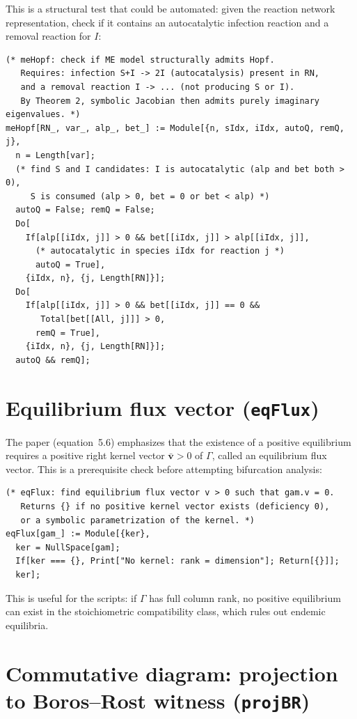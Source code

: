 \documentclass[11pt]{article}
\begin{document}
This is a structural test that could be automated: given the reaction network
representation, check if it contains an autocatalytic infection reaction and a
removal reaction for $I$:
\begin{verbatim}
(* meHopf: check if ME model structurally admits Hopf.
   Requires: infection S+I -> 2I (autocatalysis) present in RN,
   and a removal reaction I -> ... (not producing S or I).
   By Theorem 2, symbolic Jacobian then admits purely imaginary eigenvalues. *)
meHopf[RN_, var_, alp_, bet_] := Module[{n, sIdx, iIdx, autoQ, remQ, j},
  n = Length[var];
  (* find S and I candidates: I is autocatalytic (alp and bet both > 0),
     S is consumed (alp > 0, bet = 0 or bet < alp) *)
  autoQ = False; remQ = False;
  Do[
    If[alp[[iIdx, j]] > 0 && bet[[iIdx, j]] > alp[[iIdx, j]],
      (* autocatalytic in species iIdx for reaction j *)
      autoQ = True],
    {iIdx, n}, {j, Length[RN]}];
  Do[
    If[alp[[iIdx, j]] > 0 && bet[[iIdx, j]] == 0 &&
       Total[bet[[All, j]]] > 0,
      remQ = True],
    {iIdx, n}, {j, Length[RN]}];
  autoQ && remQ];
\end{verbatim}


\section{Equilibrium flux vector (\texttt{eqFlux})}

The paper (equation~5.6) emphasizes that the existence of a positive
equilibrium requires a positive right kernel vector $\bar{\mathbf{v}} > 0$
of $\Gamma$, called an equilibrium flux vector. This is a prerequisite
check before attempting bifurcation analysis:
\begin{verbatim}
(* eqFlux: find equilibrium flux vector v > 0 such that gam.v = 0.
   Returns {} if no positive kernel vector exists (deficiency 0),
   or a symbolic parametrization of the kernel. *)
eqFlux[gam_] := Module[{ker},
  ker = NullSpace[gam];
  If[ker === {}, Print["No kernel: rank = dimension"]; Return[{}]];
  ker];
\end{verbatim}

This is useful for the scripts: if $\Gamma$ has full column rank,
no positive equilibrium can exist in the stoichiometric compatibility class,
which rules out endemic equilibria.


\section{Commutative diagram: projection to Boros--Rost witness (\texttt{projBR})}
\end{document}
